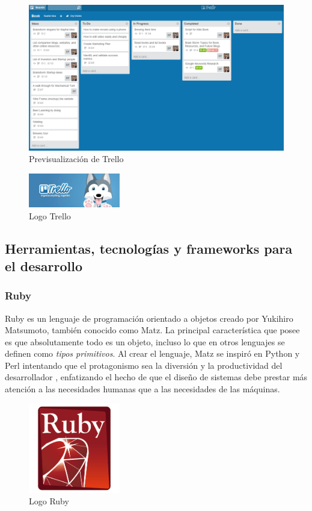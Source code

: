 		\begin{figure}[H]
		\centering
		\includegraphics[width=120mm, fbox={\fboxrule} 4mm]{images/04-metodo/20-trello_preview.png}
		\caption{Previsualización de Trello}
		\label{fig:trello-preview}
		\end{figure}
		
		\begin{figure}[H]
		\centering
		\includegraphics[width=40mm, fbox={\fboxrule} 4mm]{images/04-metodo/21-trello_logo.jpg}
		\caption{Logo Trello}
		\label{fig:trello-logo}
		\end{figure}
		
	\subsection{Herramientas, tecnologías y frameworks para el desarrollo}
		\subsubsection{Ruby}
		Ruby es un lenguaje de programación orientado a objetos creado por Yukihiro Matsumoto, también conocido como Matz. La principal característica que posee es que absolutamente todo es un objeto, incluso lo que en otros lenguajes se definen como \textit{tipos primitivos}. Al crear el lenguaje, Matz se inspiró en Python y Perl intentando que el protagonismo sea la diversión y la productividad del desarrollador \cite{Yuki20}, enfatizando el hecho de que el diseño de sistemas debe prestar más atención a las necesidades humanas que a las necesidades de las máquinas.
		
		\begin{figure}[H]
		\centering
		\includegraphics[width=40mm, fbox={\fboxrule} 4mm]{images/04-metodo/06-ruby_logo.png}
		\caption{Logo Ruby}
		\label{fig:ruby-logo}
		\end{figure}
		
